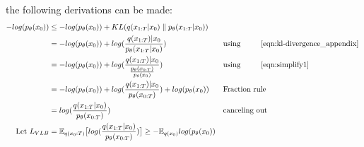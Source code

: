 \noindent the following derivations can be made:
\begingroup
\small
\begin{subequations}
	\label{eqn:vlb2_appendix}
	\begin{align}
		-log(p_\theta(x_0)) &\leq -log(p_\theta(x_0)) + KL(q(x_{1:T}|x_0) \parallel p_\theta(x_{1:T}|x_0)) &&\textrm{}\\
		&= -log(p_\theta(x_0)) + log(\frac{q(x_{1:T})|x_0}{p_\theta(x_{1:T}|x_0)}) && \textrm{using \Autoref{eqn:kl-divergence_appendix}}\\
		&=-log(p_\theta(x_0)) + log(\frac{q(x_{1:T})|x_0}{\frac{p_\theta(x_{0:T})}{p_\theta(x_{0})}}) && \textrm{using \Autoref{eqn:simplify1}}\\
		&= -log(p_\theta(x_0)) + log(\frac{q(x_{1:T})|x_0}{p_\theta(x_{0:T})})+log(p_\theta(x_{0})) && \textrm{Fraction rule}\\
		&= log(\frac{q(x_{1:T}|x_0)}{p_\theta(x_{0:T})})	&& \textrm{canceling out}\\
		\textrm{Let }L_{VLB} &= \mathbb{E}_{q(x_0:T)}\big[log(\frac{q(x_{1:T}|x_0)}{p_\theta(x_{0:T})}) \big] \geq - \mathbb{E}_{q(x_0)}log(p_\theta(x_0))
	\end{align}
\end{subequations}
\endgroup


